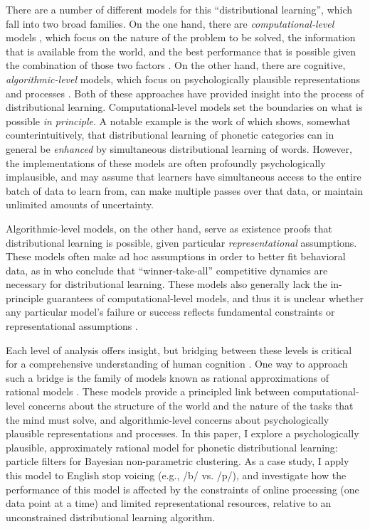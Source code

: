 \documentclass[10pt,letterpaper]{article}
\begin{document}
There are a number of different models for this \enquote{distributional
learning}, which fall into two broad families. On the one hand, there
are \emph{computational-level} models \autocite[in the sense
of][]{Marr1982}, which focus on the nature of the problem to be solved,
the information that is available from the world, and the best
performance that is possible given the combination of those two factors
\autocite[e.g.,][]{Feldman2013}. On the other hand, there are cognitive,
\emph{algorithmic-level} models, which focus on psychologically
plausible representations and processes
\autocites[e.g.,][]{McMurray2009b}{Vallabha2007}. Both of these
approaches have provided insight into the process of distributional
learning. Computational-level models set the boundaries on what is
possible \emph{in principle}. A notable example is the work of
\textcite{Feldman2013} which shows, somewhat counterintuitively, that
distributional learning of phonetic categories can in general be
\emph{enhanced} by simultaneous distributional learning of words.
However, the implementations of these models are often profoundly
psychologically implausible, and may assume that learners have
simultaneous access to the entire batch of data to learn from, can make
multiple passes over that data, or maintain unlimited amounts of
uncertainty.

Algorithmic-level models, on the other hand, serve as existence proofs
that distributional learning is possible, given particular
\emph{representational} assumptions. These models often make ad hoc
assumptions in order to better fit behavioral data, as in
\textcite{McMurray2009b} who conclude that \enquote{winner-take-all}
competitive dynamics are necessary for distributional learning. These
models also generally lack the in-principle guarantees of
computational-level models, and thus it is unclear whether any
particular model's failure or success reflects fundamental constraints
or representational assumptions \autocite[though computational-level
models are not immune to this problem;][]{Goldwater2009}.

Each level of analysis offers insight, but bridging between these levels
is critical for a comprehensive understanding of human cognition
\autocite{Marr1982}. One way to approach such a bridge is the family of
models known as rational approximations of rational models
\autocite{Sanborn2010}. These models provide a principled link between
computational-level concerns about the structure of the world and the
nature of the tasks that the mind must solve, and algorithmic-level
concerns about psychologically plausible representations and processes.
In this paper, I explore a psychologically plausible, approximately
rational model for phonetic distributional learning: particle filters
for Bayesian non-parametric clustering. As a case study, I apply this
model to English stop voicing (e.g., /b/ vs. /p/), and investigate how
the performance of this model is affected by the constraints of online
processing (one data point at a time) and limited representational
resources, relative to an unconstrained distributional learning
algorithm.
\end{document}
